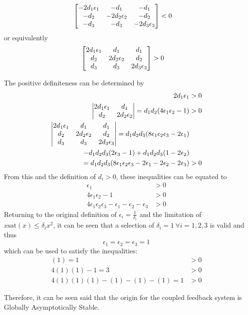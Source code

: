 \documentclass[letter]{article}
\numberwithin{equation}{section}
\newcommand{\sat}{\text{sat}}
\begin{document}
\begin{align}
	\mqty[-2 d_1\epsilon_1 & -d_1 &-d_1\\
	-d_2 &-2 d_2\epsilon_2 &-d_2\\
	-d_3	&-d_3	&-2 d_3\epsilon_3]
	&< 0
\end{align}
or equivalently
\begin{align}
	\mqty[2 d_1\epsilon_1 & d_1 &d_1\\
	d_2 &2 d_2\epsilon_2 &d_2\\
	d_3	&d_3	&2 d_3\epsilon_3]
	&> 0
\end{align}

\newpage
The positive definiteness can be determined by
\begin{align}
	2 d_1 \epsilon_1 &>0\\
	\mqty|2 d_1\epsilon_1 & d_1\\
	d_2 &2 d_2\epsilon_2| = d_1 d_2 (4 \epsilon_1 \epsilon_2 - 1) &> 0\\
	\mqty|2 d_1\epsilon_1 & d_1 &d_1\\
	d_2 &2 d_2\epsilon_2 &d_2\\
	d_3	&d_3	&2 d_3\epsilon_3|
	= d_1 d_2 d_3  (8 \epsilon_1 \epsilon_2 \epsilon_3 - 2 \epsilon_1)\nonumber\\
	- d_1 d_2 d_3(2 \epsilon_3 - 1)
	+ d_1 d_2 d_3 (1 - 2\epsilon_2)\nonumber\\
	= d_1 d_2 d_3 (8 \epsilon_1 \epsilon_2 \epsilon_3 
	- 2 \epsilon_1
	- 2 \epsilon_2
	- 2 \epsilon_3)
	&>0
\end{align}
From this and the definition of $d_i > 0$, these inequalities can be equated to
\begin{align}
	\epsilon_1&>0\\
	4 \epsilon_1 \epsilon_2 -1 &>0\\
	4 \epsilon_1 \epsilon_2 \epsilon_3 - \epsilon_1 - \epsilon_2 - \epsilon_3 &> 0	
\end{align}
Returning to the original definition of $\epsilon_i = \frac{1}{\delta_i}$ and the limitation of $x \sat(x) \leq \delta_i x^2$,
it can be seen that a selection of $\delta_i = 1 \ \forall i=1,2,3$ is valid and thus $$\epsilon_1 = \epsilon_2 = \epsilon_3 = 1$$
which can be used to satisfy the inequalities:
\begin{align}
	(1) = 1&>0\\
	4 (1) (1) -1 = 3 &>0\\
	4 (1) (1) (1) - (1) - (1) - (1) = 1 &> 0	
\end{align}

Therefore, it can be seen said that the origin for the coupled feedback system is Globally Asymptotically Stable.
\end{document}
